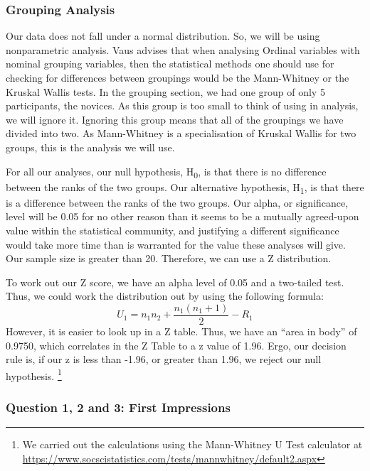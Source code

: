 \subsubsection{Grouping Analysis}
Our data does not fall under a normal distribution. 
So, we will be using nonparametric analysis.
Vaus\cite{de2013surveys} advises that when analysing Ordinal variables with nominal grouping variables, then the statistical methods one should use for checking for differences between groupings would be the Mann-Whitney\cite{mann1947test} or the Kruskal Wallis\cite{kruskal1952use} tests.
In the grouping section, we had one group of only 5 participants, the novices.
As this group is too small to think of using in analysis, we will ignore it.
Ignoring this group means that all of the groupings we have divided into two.
As Mann-Whitney is a specialisation of Kruskal Wallis for two groups, this is the analysis we will use.

For all our analyses, our null hypothesis, H\textsubscript{0}, is that there is no difference between the ranks of the two groups. 
Our alternative hypothesis, H\textsubscript{1}, is that there is a difference between the ranks of the two groups.
Our alpha, or significance, level will be 0.05 for no other reason than it seems to be a mutually agreed-upon value within the statistical community, and justifying a different significance would take more time than is warranted for the value these analyses will give.
Our sample size is greater than 20. 
Therefore, we can use a Z distribution.

To work out our Z score, we have an alpha level of 0.05 and a two-tailed test.
Thus, we could work the distribution out by using the following formula:
\[U_{1}=n_{1}n_{2}+\frac{n_{1}(n_{1}+1)}{2}-R_{1}\]
However, it is easier to look up in a Z table.
Thus, we have an ``area in body'' of 0.9750, which correlates in the Z Table to a z value of 1.96.
Ergo, our decision rule is, if our z is less than -1.96, or greater than 1.96, we reject our null hypothesis.
\footnote{We carried out the calculations using the Mann-Whitney U Test calculator at \url{https://www.socscistatistics.com/tests/mannwhitney/default2.aspx}}

\pagebreak
\subsubsection{Question 1, 2 and 3: First Impressions}


